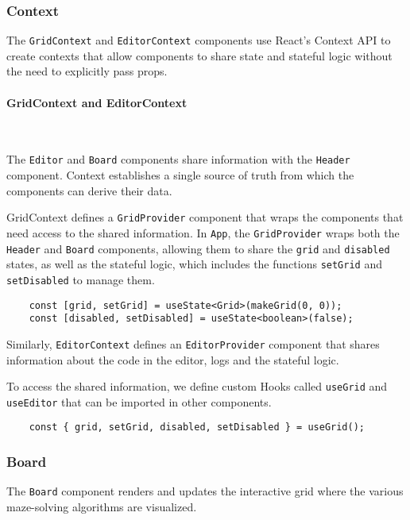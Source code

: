 \subsubsection{Context}
The \texttt{GridContext} and \texttt{EditorContext} components use React’s Context API to create contexts that allow components to share state and stateful logic without the need to explicitly pass props.

\paragraph{GridContext and EditorContext} \

The \texttt{Editor} and \texttt{Board} components share information with the \texttt{Header} component. Context establishes a single source of truth from which the components can derive their data.

GridContext defines a \texttt{GridProvider} component that wraps the components that need access to the shared information. In \texttt{App}, the \texttt{GridProvider} wraps both the \texttt{Header} and \texttt{Board} components, allowing them to share the \texttt{grid} and \texttt{disabled} states, as well as the stateful logic, which includes the functions \texttt{setGrid} and \texttt{setDisabled} to manage them.

\begin{verbatim}
    const [grid, setGrid] = useState<Grid>(makeGrid(0, 0));
    const [disabled, setDisabled] = useState<boolean>(false);
\end{verbatim}

Similarly, \texttt{EditorContext} defines an \texttt{EditorProvider} component that shares information about the code in the editor, logs and the stateful logic.

To access the shared information, we define custom Hooks called \texttt{useGrid} and \texttt{useEditor} that can be imported in other components.

\begin{verbatim}
    const { grid, setGrid, disabled, setDisabled } = useGrid();
\end{verbatim}

\subsubsection{Board}
The \texttt{Board} component renders and updates the interactive grid where the various maze-solving algorithms are visualized.

